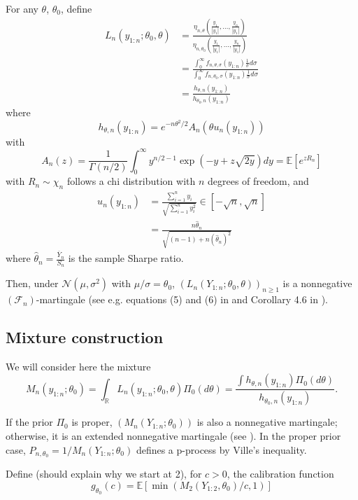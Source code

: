 \documentclass{article}%
\begin{document}
  For any $\theta$, $\theta_0$, define
\begin{align}
L_n(y_{1:n};\theta_0,\theta)&=\frac{\eta_{n,\theta}\left(\frac{y_1}{|y_1|},\ldots,\frac{y_n}{|y_1|}\right)}{\eta_{n,\theta_0}\left (\frac{y_1}{|y_1|},\ldots,\frac{y_n}{|y_1|}\right )}\\
&=\frac{\int_0^\infty  f_{n,\theta,\sigma}\left(y_{1:n}\right)\frac{1}{\sigma}d\sigma}{\int_0^\infty  f_{n,\theta_0,\sigma}\left(y_{1:n}\right)\frac{1}{\sigma}d\sigma}\\
&=\frac{h_{\theta,n}(y_{1:n})}{h_{\theta_0,n}(y_{1:n})}
\end{align}
where
$$
h_{\theta,n}(y_{1:n})=e^{-n\theta^2/2}A_n(\theta u_n(y_{1:n}))
$$
with
$$
A_n(z)=\frac{1}{\Gamma(n/2)}\int_0^\infty y^{n/2-1}\exp(-y+z\sqrt{2y})dy=\mathbb E[e^{z R_n}]
$$
with $R_n\sim \chi_n$ follows a chi distribution with $n$ degrees of freedom, and
\begin{align}
u_n(y_{1:n})&=\frac{\sum_{i=1}^n y_i}{\sqrt{\sum_{i=1}^n y_i^2}}\in[-\sqrt{n},\sqrt{n}]\\
&=\frac{n\widehat \theta_n}{\sqrt{(n-1)+n(\widehat\theta_n)^2}}
\end{align}
where $\widehat\theta_n=\frac{\overline Y_n}{S_n}$ is the sample Sharpe ratio.

Then, under $\mathcal N(\mu,\sigma^2)$ with $\mu/\sigma=\theta_0$,  $(L_n(Y_{1:n};\theta_0,\theta))_{n\geq 1}$ is a nonnegative $(\mathcal F_n)$-martingale  (see e.g. equations (5) and (6) in \cite{PerezOrtiz2024} and Corollary 4.6 in \cite{Wang2025}).


\subsection{Mixture construction}


We will consider here the mixture
$$
M_n(y_{1:n};\theta_0)=\int_{\mathbb R} L_n(y_{1:n};\theta_0,\theta)\Pi_0(d\theta)=\frac{\int h_{\theta,n}(y_{1:n})\Pi_0(d\theta)}{h_{\theta_0,n}(y_{1:n})}.
$$

If the prior $\Pi_0$ is proper, $(M_n(Y_{1:n};\theta_0))$ is also a nonnegative martingale; otherwise, it is an extended nonnegative martingale (see \cite{Wang2025}). In the proper prior case, $P_{n,\theta_0}=1/M_n(Y_{1:n};\theta_0)$ defines a p-process by Ville's inequality. 


Define (should explain why we start at 2), for $c>0$, the calibration function
$$
g_{\theta_0}(c)=\mathbb E\left[\min(M_2(Y_{1:2},\theta_0)/c,1)     \right]
$$
\end{document}
